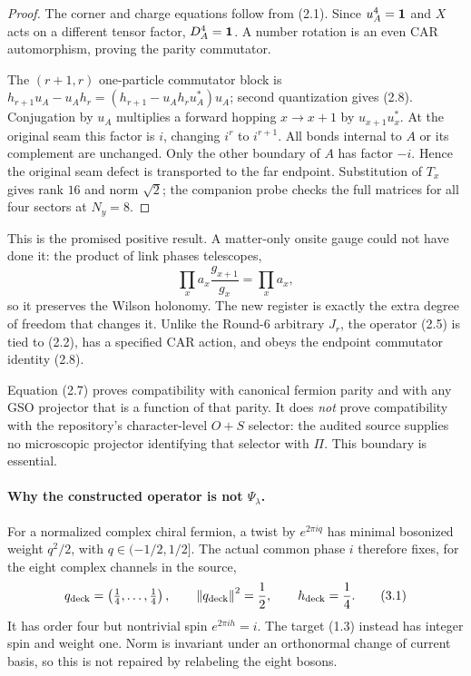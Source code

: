 \begin{proof}
The corner and charge equations follow from (2.1).  Since $u_A^4=\mathbf 1$ and
$X$ acts on a different tensor factor, $D_A^4=\mathbf 1$.  A number rotation is an
even CAR automorphism, proving the parity commutator.

The $(r+1,r)$ one-particle commutator block is
$h_{r+1}u_A-u_Ah_r=(h_{r+1}-u_Ah_ru_A^*)u_A$; second quantization gives
(2.8).  Conjugation by $u_A$ multiplies a forward hopping $x\to x+1$ by
$u_{x+1}u_x^*$.  At the original seam this factor is $i$, changing $i^r$
to $i^{r+1}$.  All bonds internal to $A$ or its complement are unchanged.
Only the other boundary of $A$ has factor $-i$.  Hence the original seam
defect is transported to the far endpoint.  Substitution of $T_x$ gives
rank $16$ and norm $\sqrt2$; the companion probe checks the full matrices
for all four sectors at $N_y=8$.
\end{proof}

This is the promised positive result.  A matter-only onsite gauge could not
have done it: the product of link phases telescopes,
\[
 \prod_x a_x\frac{g_{x+1}}{g_x}=\prod_xa_x,
\tag{2.9}
\]
so it preserves the Wilson holonomy.  The new register is exactly the extra
degree of freedom that changes it.  Unlike the Round-6 arbitrary $J_r$, the
operator (2.5) is tied to (2.2), has a specified CAR action, and obeys the
endpoint commutator identity (2.8).

Equation (2.7) proves compatibility with canonical fermion parity and with
any GSO projector that is a function of that parity.  It does \emph{not}
prove compatibility with the repository's character-level $O+S$ selector:
the audited source supplies no microscopic projector identifying that
selector with $\Pi$.  This boundary is essential.

\paragraph{Why the constructed operator is not \texorpdfstring{$\Psi_\lambda$.}{Psi-lambda}}

For a normalized complex chiral fermion, a twist by $e^{2\pi iq}$ has
minimal bosonized weight $q^2/2$, with $q\in(-1/2,1/2]$.  The actual common
phase $i$ therefore fixes, for the eight complex channels in the source,
\[
 q_{\rm deck}=\left(\tfrac14,\ldots,\tfrac14\right),\qquad
 \left\lVert q_{\rm deck}\right\rVert^2=\frac12,\qquad h_{\rm deck}=\frac14.
\tag{3.1}
\]
It has order four but nontrivial spin $e^{2\pi ih}=i$.  The target (1.3)
instead has integer spin and weight one.  Norm is invariant under an
orthonormal change of current basis, so this is not repaired by relabeling
the eight bosons.

